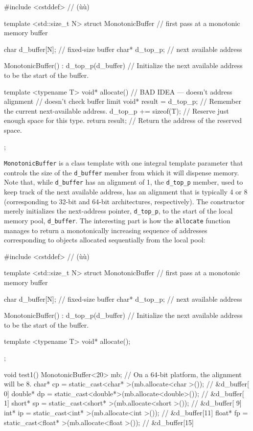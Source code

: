 \begin{emcppslisting}
#include <cstddef>  // (ù{}ù) 

template <std::size_t N>
struct MonotonicBuffer  // first pass at a monotonic memory buffer
{
    char  d_buffer[N];  // fixed-size buffer
    char* d_top_p;      //  next available address

    MonotonicBuffer() : d_top_p(d_buffer) { }
       // Initialize the next available address to be the start of the buffer.

    template <typename T>
    void* allocate()             // BAD IDEA --- doesn't address alignment
                                 // doesn't check buffer limit
    {
        void* result = d_top_p;  // Remember the current next-available address.
        d_top_p += sizeof(T);    // Reserve just enough space for this type.
        return result;           // Return the address of the reserved space.
    }
};
\end{emcppslisting}
    
\noindent \lstinline!MonotonicBuffer! is a class template with one integral template
parameter that controls the size of the \lstinline!d_buffer! member from
which it will dispense memory. Note that, while \lstinline!d_buffer! has
an alignment of 1, the \lstinline!d_top_p! member, used to keep track of
the next available address, has an alignment that is typically 4 or 8
(corresponding to 32-bit and 64-bit architectures, respectively). The
constructor merely initializes the next-address pointer,
\lstinline!d_top_p!, to the start of the local memory pool,
\lstinline!d_buffer!. The interesting part is how the \lstinline!allocate!
function manages to return a monotonically increasing sequence of addresses corresponding to
objects allocated sequentially from the local pool:

\begin{emcppshiddenlisting}[emcppsbatch=e3]
#include <cstddef>  // (ù{}ù) 

template <std::size_t N>
struct MonotonicBuffer  // first pass at a monotonic memory buffer
{
    char  d_buffer[N];  // fixed-size buffer
    char* d_top_p;      //  next available address

    MonotonicBuffer() : d_top_p(d_buffer) { }
       // Initialize the next available address to be the start of the buffer.

    template <typename T>
    void* allocate();
};
\end{emcppshiddenlisting}
\begin{emcppslisting}[emcppsbatch=e3]
void test1()
{
    MonotonicBuffer<20> mb;  // On a 64-bit platform, the alignment will be 8.
    char*   cp = static_cast<char*  >(mb.allocate<char  >());  // &d_buffer[ 0]
    double* dp = static_cast<double*>(mb.allocate<double>());  // &d_buffer[ 1]
    short*  sp = static_cast<short* >(mb.allocate<short >());  // &d_buffer[ 9]
    int*    ip = static_cast<int*   >(mb.allocate<int   >());  // &d_buffer[11]
    float*  fp = static_cast<float* >(mb.allocate<float >());  // &d_buffer[15]
}
\end{emcppslisting}
    
